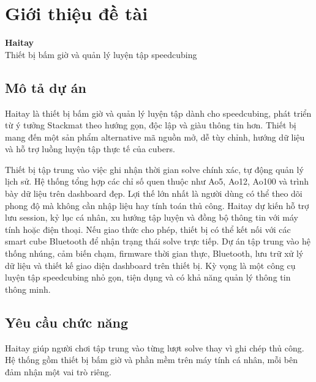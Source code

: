 \chapter{Giới thiệu đề tài}

\begin{tcolorbox}[
    colback=haitayblue!8,
    colframe=haitayblue,
    arc=4pt,
    boxrule=0.8pt,
    halign=center,
    valign=center
]
    {\LARGE\bfseries\color{haitayblue} Haitay}\\[0.35em]
    {\large Thiết bị bấm giờ và quản lý luyện tập speedcubing}
\end{tcolorbox}

\vspace{0.8em}


\section{Mô tả dự án}
Haitay là thiết bị bấm giờ và quản lý luyện tập dành cho speedcubing, phát triển từ ý tưởng Stackmat theo hướng gọn, độc lập và giàu thông tin hơn. Thiết bị mang đến một sản phẩm alternative mã nguồn mở, dễ tùy chỉnh, hướng dữ liệu và hỗ trợ luồng luyện tập thực tế của cubers.

Thiết bị tập trung vào việc ghi nhận thời gian solve chính xác, tự động quản lý lịch sử. Hệ thống tổng hợp các chỉ số quen thuộc như Ao5, Ao12, Ao100 và trình bày dữ liệu trên dashboard đẹp. Lợi thế lớn nhất là người dùng có thể theo dõi phong độ mà không cần nhập liệu hay tính toán thủ công. Haitay dự kiến hỗ trợ lưu session, kỷ lục cá nhân, xu hướng tập luyện và đồng bộ thông tin với máy tính hoặc điện thoại. Nếu giao thức cho phép, thiết bị có thể kết nối với các smart cube Bluetooth để nhận trạng thái solve trực tiếp. Dự án tập trung vào hệ thống nhúng, cảm biến chạm, firmware thời gian thực, Bluetooth, lưu trữ xử lý dữ liệu và thiết kế giao diện dashboard trên thiết bị. Kỳ vọng là một công cụ luyện tập speedcubing nhỏ gọn, tiện dụng và có khả năng quản lý thông tin thông minh.


\section{Yêu cầu chức năng}
Haitay giúp người chơi tập trung vào từng lượt solve thay vì ghi chép thủ công. Hệ thống gồm thiết bị bấm giờ và phần mềm trên máy tính cá nhân, mỗi bên đảm nhận một vai trò riêng.

